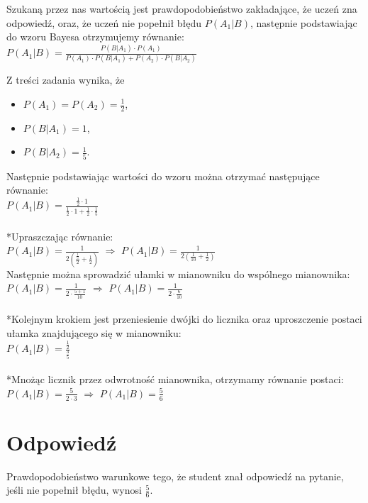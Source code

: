 \documentclass[UTF8]{article}
\begin{document}
\bigskip
\noindent Szukaną przez nas wartością jest prawdopodobieństwo zakładające, że uczeń zna odpowiedź, oraz, że uczeń nie popełnił błędu $P(A_{1}|B)$, następnie podstawiając do wzoru Bayesa otrzymujemy równanie:
\\$P(A_{1}|B) = \frac{P(B|A_{1}) \cdot P(A_{1})}{P(A_{1}) \cdot P(B|A_{1}) + P(A_{2}) \cdot P(B|A_{2})}$

\bigskip 
\noindent Z treści zadania wynika, że 
\begin{itemize}
	\item $P(A_{1}) = P(A_{2}) = \frac{1}{2}$, 
	\item $P(B|A_{1}) = 1$,
	\item $P(B|A_{2}) = \frac{1}{5}$.
\end{itemize}
Następnie podstawiając wartości do wzoru można otrzymać następujące równanie:\\
$P(A_{1}|B) = \frac{\frac{1}{2} \cdot 1}{\frac{1}{2} \cdot 1 + \frac{1}{2} \cdot \frac{1}{5}}$\\
\\*Upraszczając równanie:
\\$P(A_{1}|B) = \frac{1}{2(\frac{\frac{1}{5}}{2} + \frac{1}{2})}$ $\Rightarrow$ $P(A_{1}|B) = \frac{1}{2(\frac{1}{10} + \frac{1}{2})}$ \\
Następnie można sprowadzić ułamki w mianowniku do wspólnego mianownika:
\\$P(A_{1}|B) = \frac{1}{2\cdot \frac{5+1}{10}}$ $\Rightarrow$ $P(A_{1}|B) = \frac{1}{2 \cdot \frac{6}{10}}$\\
\\*Kolejnym krokiem jest przeniesienie dwójki do licznika oraz uproszczenie postaci ułamka znajdującego się w mianowniku:
\\$P(A_{1}|B) = \frac{\frac{1}{2}}{\frac{3}{5}}$\\
\\*Mnożąc licznik przez odwrotność mianownika, otrzymamy równanie postaci:
\\$P(A_{1}|B) = \frac{5}{2 \cdot 3}$ $\Rightarrow$ $P(A_{1}|B) = \frac{5}{6}$

\newpage

\section{Odpowiedź}
Prawdopodobieństwo warunkowe tego, że student znał odpowiedź na pytanie, jeśli nie popełnił błędu, wynosi $\frac{5}{6}$.
\end{document}
